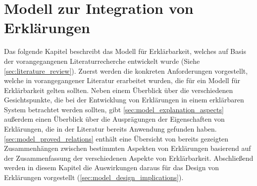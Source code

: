 \chapter{Modell zur Integration von Erklärungen}

Das folgende Kapitel beschreibt das Modell für Erklärbarkeit, welches auf Basis der vorangegangenen Literaturrecherche entwickelt wurde (Siehe \autoref{sec:literature_review}). Zuerst werden die konkreten Anforderungen vorgestellt, welche in vorangegangener Literatur erarbeitet wurden, die für ein Modell für Erklärbarkeit gelten sollten. Neben einem Überblick über die verschiedenen Gesichtspunkte, die bei der Entwicklung von Erklärungen in einem erklärbaren System betrachtet werden sollten, gibt \autoref{sec:model_explanation_aspects} außerdem einen Überblick über die Ausprägungen der Eigenschaften von Erklärungen, die in der Literatur bereits Anwendung gefunden haben. \autoref{sec:model_proved_relations} enthält eine Übersicht von bereits gezeigten Zusammenhängen zwischen bestimmten Aspekten von Erklärungen basierend auf der Zusammenfassung der verschiedenen Aspekte von Erklärbarkeit. Abschließend werden in diesem Kapitel die Auswirkungen daraus für das Design von Erklärungen vorgestellt (\autoref{sec:model_design_implications}).







